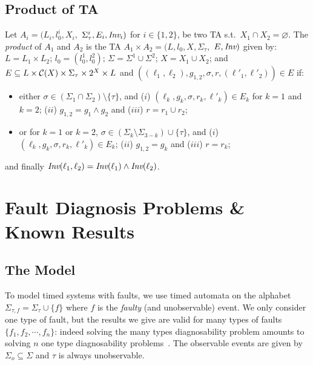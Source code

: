 \documentclass[letterpaper,10pt,conference]{ieeeconf}  \IEEEoverridecommandlockouts                              \overrideIEEEmargins
\def\st{{s.t.}~}
\def\emptyset{\varnothing}
\def\calC{{\cal C}}
\def\endef{\ifmmode\squareforged\else{\unskip\nobreak\hfil
\penalty50\hskip1em\null\nobreak\hfil$\blacksquare$
\parfillskip=0pt\finalhyphendemerits=0\endgraf}\fi}
\def\tauac{\tau}
\begin{document}
\subsection{Product of TA}
\begin{definition} \label{def-prod-sync} Let
  $A_i=(L_i,l_0^i,X_i,$ $\Sigma^i_{\tauac},E_i,\inv_i)$ for $i \in\{1,2\}$,
  be two TA \st $X_1 \cap X_2 = \emptyset$.  The \emph{product} of
  $A_1$ and $A_2$ is the TA $A_1 \times
  A_2=(L,l_0,X,\Sigma_{\tauac},$ $E,\textit{Inv})$ given by:
$L=L_1 \times L_2$;
$l_0=(l_0^1,l_0^2)$;
$\Sigma=\Sigma^1 \cup \Sigma^2$;
$X = X_1 \cup X_2$; and
$E \subseteq L \times \calC(X) \times \Sigma_\tauac \times 2^X \times
    L$ and
    $((\ell_1,\ell_2),g_{1,2},\sigma,r,(\ell'_1,\ell'_2)) \in E$
    if:
    \begin{itemize}
    \item either $\sigma \in (\Sigma_1 \cap \Sigma_2) \setminus
      \{\tauac \}$, and ($i$) $(\ell_k,g_k,\sigma,r_k,\ell'_k) \in
      E_k$ for $k=1$ and $k=2$; ($ii$) $g_{1,2} = g_1 \wedge g_2$ and
      ($iii$) $r=r_1 \cup r_2$;
    \item or for $k=1$ or $k=2$, $\sigma \in (\Sigma_k \setminus
      \Sigma_{3-k}) \cup \{\tauac\}$, and ($i$)
      $(\ell_k,g_k,\sigma,r_k,\ell'_k) \in E_k$; ($ii$) $g_{1,2}=g_k$
      and ($iii$) $r=r_k$;
\end{itemize}
and finally $\textit{Inv}(\ell_1,\ell_2)= \textit{Inv}(\ell_1) \wedge
    \textit{Inv}(\ell_2)$.
     \endef
\end{definition}





\section{Fault Diagnosis Problems \& Known Results}\label{sec-fd}

\subsection{The Model}
To model timed systems with faults, we use timed automata on the
alphabet $\Sigma_{\tauac,f}=\Sigma_{\tauac}\cup \{f\}$ where $f$ is
the \emph{faulty} (and unobservable) event. We only consider one type
of fault, but the results we give are valid for many types of
faults $\{f_1,f_2, \cdots,f_n\}$: indeed solving the many types
diagnosability problem amounts to solving $n$ one type diagnosability
problems~\cite{yoo-lafortune-tac-02}.
The observable events are given by $\Sigma_o \subseteq \Sigma$ and
$\tauac$ is always unobservable.
\end{document}
